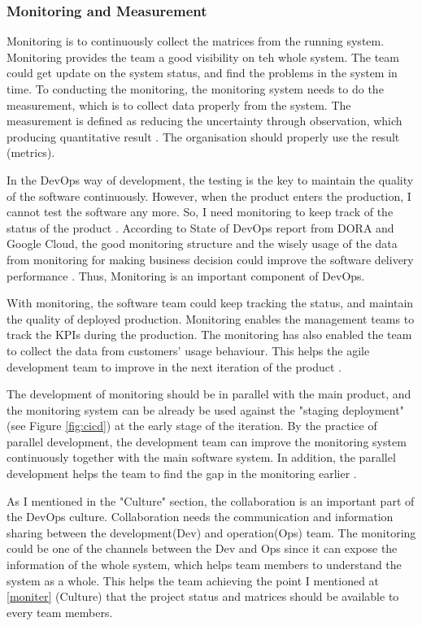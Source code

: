 \subsubsection[]{Monitoring and Measurement}
Monitoring is to continuously collect the matrices from the running system. Monitoring provides the team a good visibility on teh whole system. The team could get update on the system status, and find the problems in the system in time. To conducting the monitoring, the monitoring system needs to do the measurement, which is to collect data properly from the system. The measurement is defined as reducing the uncertainty through observation, which producing quantitative result \cite{hering2015measure}. The organisation should properly use the result (metrics).
\par
In the DevOps way of development, the testing is the key to maintain the quality of the software continuously. However, when the product enters the production, I cannot test the software any more. So, I need monitoring to keep track of the status of the product \cite{huttermann2012devops}. According to State of DevOps report from DORA and Google Cloud, the good monitoring structure and the wisely usage of the data from monitoring for making business decision could improve the software delivery performance \cite{forsgrenaccelerate}. Thus, Monitoring is an important component of DevOps.
\par
With monitoring, the software team could keep tracking the status, and maintain the quality of deployed production. Monitoring enables the management teams to track the KPIs during the production. The monitoring has also enabled the team to collect the data from customers' usage behaviour. This helps the agile development team to improve in the next iteration of the product \cite{lwakatare2015dimensions}.
\par
The development of monitoring should be in parallel with the main product, and the monitoring system can be already be used against the "staging deployment" (see Figure \ref{fig:cicd}) at the early stage of the iteration. By the practice of parallel development, the development team can improve the monitoring system continuously together with the main software system. In addition, the parallel development helps the team to find the gap in the monitoring earlier \cite{huttermann2012devops}.
\par
As I mentioned in the "Culture" section, the collaboration is an important part of the DevOps culture. Collaboration needs the communication and information sharing between the development(Dev) and operation(Ops) team. The monitoring could be one of the channels between the Dev and Ops since it can expose the information of the whole system, which helps team members to understand the system as a whole. This helps the team achieving the point I mentioned at \ref{moniter} (Culture) that the project status and matrices should be available to every team members.
